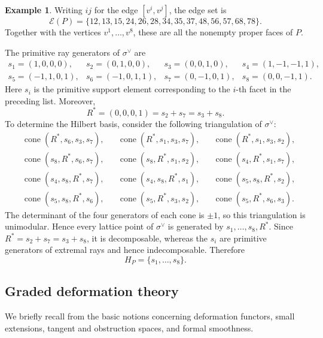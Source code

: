\documentclass[11pt]{amsart}
\numberwithin{equation}{section}
\theoremstyle{plain}
\theoremstyle{definition}
\newtheorem{example}[theorem]{Example}
\newcommand{\0}{$0$-mutable}
\renewcommand{\1}{$1$-rigid}
\renewcommand{\0}{$0$-mutable}
\begin{document}
\begin{example}
{Writing \(ij\) for the edge \([v^i,v^j]\), the edge set is
\[
\mathcal E(P)
=
\{12,13,15,24,26,28,34,35,37,48,56,57,68,78\}.
\]
Together with the vertices \(v^1,\ldots,v^8\), these are all the
nonempty proper faces of \(P\).}



The primitive ray generators of \(\sigma^\vee\) are
\[
\begin{array}{llll}
s_1=(1,0,0,0),
& s_2=(0,1,0,0),
& s_3=(0,0,1,0),
& s_4=(1,-1,-1,1),\\[1mm]
s_5=(-1,1,0,1),
& s_6=(-1,0,1,1),
& s_7=(0,-1,0,1),
& s_8=(0,0,-1,1).
\end{array}
\]
{
Here \(s_i\) is the primitive support element corresponding to the
\(i\)-th facet in the preceding list.}
Moreover,
\[
R^*=(0,0,0,1)=s_2+s_7=s_3+s_8.
\]
To determine the Hilbert basis, consider the following triangulation of
\(\sigma^\vee\):
\[
\begin{aligned}
&\operatorname{cone}(R^*,s_6,s_3,s_7),
&&\operatorname{cone}(R^*,s_1,s_3,s_7),
&&\operatorname{cone}(R^*,s_1,s_3,s_2),\\
&\operatorname{cone}(s_8,R^*,s_6,s_7),
&&\operatorname{cone}(s_8,R^*,s_1,s_2),
&&\operatorname{cone}(s_4,R^*,s_1,s_7),\\
&\operatorname{cone}(s_4,s_8,R^*,s_7),
&&\operatorname{cone}(s_4,s_8,R^*,s_1),
&&\operatorname{cone}(s_5,s_8,R^*,s_2),\\
&\operatorname{cone}(s_5,s_8,R^*,s_6),
&&\operatorname{cone}(s_5,R^*,s_3,s_2),
&&\operatorname{cone}(s_5,R^*,s_6,s_3).
\end{aligned}
\]
The determinant of the four generators of each cone is \(\pm1\), so this
triangulation is unimodular. Hence every lattice point of
\(\sigma^\vee\) is generated by \(s_1,\ldots,s_8,R^*\). Since
\(R^*=s_2+s_7=s_3+s_8\), it is decomposable, whereas the \(s_i\) are
primitive generators of extremal rays and hence indecomposable.
Therefore
\[
H_P=\{s_1,\ldots,s_8\}.
\]
\end{example}









\subsection{Graded deformation theory}
\label{sub graded deformation theory}


We briefly recall from \cite[Chapters~2 and~3]{Ser06} the basic notions
concerning deformation functors, small extensions, tangent and
obstruction spaces, and formal smoothness.
\end{document}
